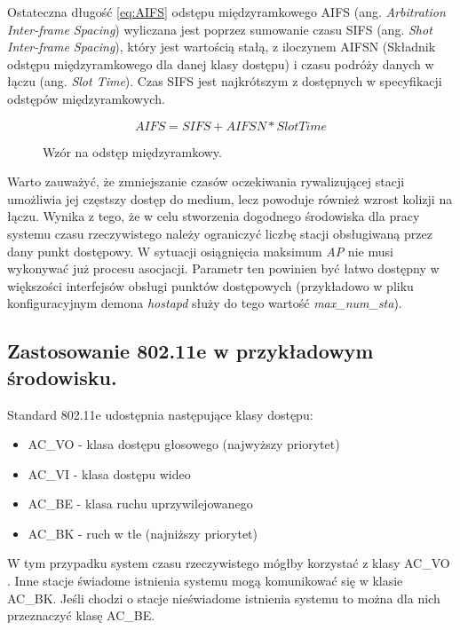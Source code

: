 Ostateczna długość \eqref{eq:AIFS} odstępu międzyramkowego AIFS (ang. \emph{Arbitration Inter-frame Spacing}) wyliczana jest poprzez sumowanie czasu SIFS (ang. \emph{Shot Inter-frame Spacing}), który jest wartością stałą, z iloczynem AIFSN (Składnik odstępu międzyramkowego dla danej klasy dostępu) i czasu podróży danych w łączu (ang. \emph{Slot Time}). Czas SIFS jest najkrótszym z dostępnych w specyfikacji odstępów międzyramkowych.    

\begin{figure}
\caption{Wzór na odstęp międzyramkowy.}
\begin{equation} 
\label{eq:AIFS}
AIFS = SIFS + AIFSN * Slot Time 
\end{equation}
\end{figure}

Warto zauważyć, że zmniejszanie czasów oczekiwania rywalizującej stacji umożliwia jej częstszy
dostęp do medium, lecz powoduje również wzrost kolizji na łączu. Wynika z tego, że w celu stworzenia dogodnego środowiska dla pracy systemu czasu rzeczywistego należy ograniczyć liczbę stacji obsługiwaną przez dany punkt dostępowy. W sytuacji osiągnięcia maksimum \emph{AP} nie musi wykonywać już procesu asocjacji. Parametr ten powinien być łatwo dostępny w większości interfejsów obsługi punktów dostępowych (przykładowo w pliku konfiguracyjnym demona \emph{hostapd} służy do tego wartość \emph{max\_num\_sta}).

\subsection{Zastosowanie 802.11e w przykładowym środowisku.}

Standard 802.11e udostępnia następujące klasy dostępu:

\begin{itemize}
\item AC\_VO - klasa dostępu głosowego (najwyższy priorytet)
\item AC\_VI - klasa dostępu wideo
\item AC\_BE - klasa ruchu uprzywilejowanego 
\item AC\_BK - ruch w tle (najniższy priorytet)
\end{itemize}

W tym przypadku system czasu rzeczywistego mógłby korzystać z klasy AC\_VO \cite{pub:802.11e}. Inne stacje świadome istnienia systemu mogą komunikować się w klasie AC\_BK. Jeśli chodzi o stacje nieświadome istnienia systemu to można dla nich przeznaczyć klasę AC\_BE.

